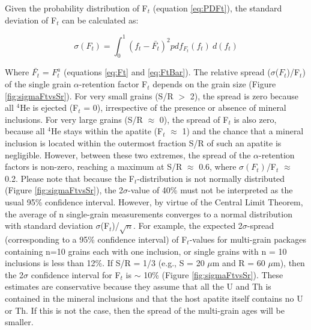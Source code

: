\documentclass{article}
\begin{document}
Given the probability distribution of F$_t$ (equation \ref{eq:PDFt}), 
the standard deviation of F$_t$ can be calculated as:

\begin{equation}
  \label{eq:sigmaFt}
  \sigma(F_t) = \int_0^1 \left(f_t - \bar{F_t}\right)^2 pdf_{F_t}(f_t) ~ d(f_t)
\end{equation}

Where    $\bar{F_t}$   =    $F_t^a$    (equations   \ref{eq:Ft}    and
\ref{eq:FtBar}).  The  relative spread ($\sigma$($F_t$)/F$_t$)  of the
single grain $\alpha$-retention factor F$_t$ depends on the grain size
(Figure \ref{fig:sigmaFtvsSr}).   For very  small grains (S/R  $>$ 2),
the  spread  is  zero because  all  $^4$He  is  ejected (F$_t$  =  0),
irrespective  of the presence  or absence  of mineral  inclusions. For
very large grains (S/R $\approx$ 0), the spread of F$_t$ is also zero,
because all  $^4$He stays within  the apatite (F$_t$ $\approx$  1) and
the chance  that a mineral  inclusion is located within  the outermost
fraction S/R of such an apatite is negligible.  However, between these
two  extremes,  the  spread   of  the  $\alpha$-retention  factors  is
non-zero,   reaching   a  maximum   at   S/R   $\approx$  0.6,   where
$\sigma(F_t)$/F$_t$  $\approx$  0.2.   Please  note that  because  the
F$_t$-distribution    is     not    normally    distributed    (Figure
\ref{fig:sigmaFtvsSr}),  the  2$\sigma$-value  of  40\%  must  not  be
interpreted as the usual 95\% confidence interval.  However, by virtue
of  the   Central  Limit  Theorem,  the  average   of  n  single-grain
measurements  converges   to  a  normal   distribution  with  standard
deviation  $\sigma$(F$_t$)/$\sqrt{n}$.    For  example,  the  expected
2$\sigma$-spread  (corresponding  to a  95\%  confidence interval)  of
F$_t$-values for multi-grain packages containing n=10 grains each with
one inclusion,  or single grains with  n = 10 inclusions  is less than
12\%.  If S/R = 1/3 (e.g., S =  20 $\mu$m and R = 60 $\mu$m), then the
2$\sigma$  confidence  interval  for  F$_t$  is  $\sim$  10\%  (Figure
\ref{fig:sigmaFtvsSr}). These estimates  are conservative because they
assume that  all the U and  Th is contained in  the mineral inclusions
and that the host apatite itself contains  no U or Th.  If this is not
the case, then the spread of the multi-grain ages will be smaller.
\end{document}
